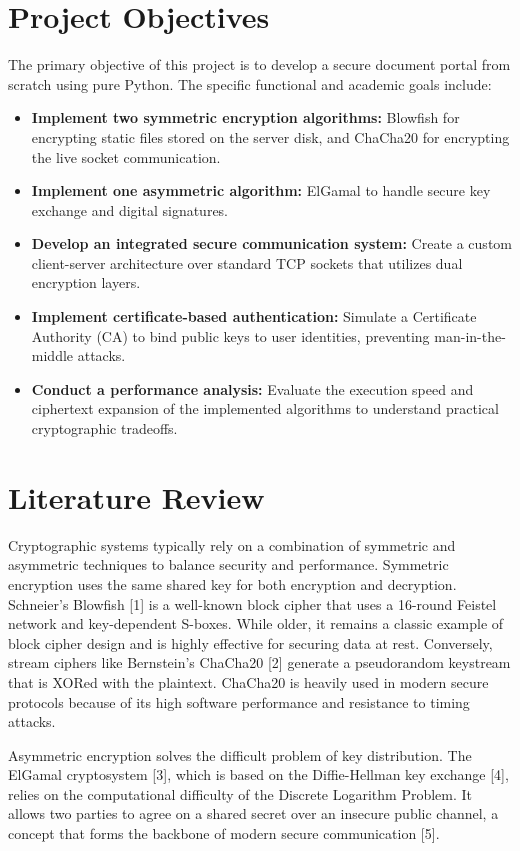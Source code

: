 \documentclass[12pt,a4paper]{article}
\begin{document}
\section{Project Objectives}
The primary objective of this project is to develop a secure document portal from scratch using pure Python. The specific functional and academic goals include:
\begin{itemize}
    \item \textbf{Implement two symmetric encryption algorithms:} Blowfish for encrypting static files stored on the server disk, and ChaCha20 for encrypting the live socket communication.
    \item \textbf{Implement one asymmetric algorithm:} ElGamal to handle secure key exchange and digital signatures.
    \item \textbf{Develop an integrated secure communication system:} Create a custom client-server architecture over standard TCP sockets that utilizes dual encryption layers.
    \item \textbf{Implement certificate-based authentication:} Simulate a Certificate Authority (CA) to bind public keys to user identities, preventing man-in-the-middle attacks.
    \item \textbf{Conduct a performance analysis:} Evaluate the execution speed and ciphertext expansion of the implemented algorithms to understand practical cryptographic tradeoffs.
\end{itemize}

\section{Literature Review}
Cryptographic systems typically rely on a combination of symmetric and asymmetric techniques to balance security and performance. Symmetric encryption uses the same shared key for both encryption and decryption. Schneier's Blowfish [1] is a well-known block cipher that uses a 16-round Feistel network and key-dependent S-boxes. While older, it remains a classic example of block cipher design and is highly effective for securing data at rest. Conversely, stream ciphers like Bernstein's ChaCha20 [2] generate a pseudorandom keystream that is XORed with the plaintext. ChaCha20 is heavily used in modern secure protocols because of its high software performance and resistance to timing attacks.

Asymmetric encryption solves the difficult problem of key distribution. The ElGamal cryptosystem [3], which is based on the Diffie-Hellman key exchange [4], relies on the computational difficulty of the Discrete Logarithm Problem. It allows two parties to agree on a shared secret over an insecure public channel, a concept that forms the backbone of modern secure communication [5]. 
\end{document}
